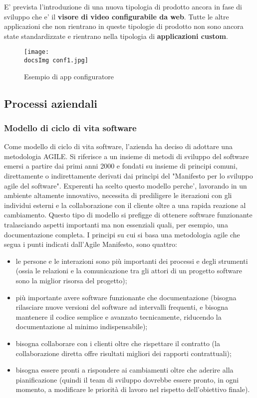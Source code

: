 E' prevista l'introduzione di una nuova tipologia di prodotto ancora in fase di sviluppo che e' il \textbf{visore di video configurabile da web}. Tutte le altre applicazioni che non rientrano in queste tipologie di prodotto non sono ancora state standardizzate e rientrano nella tipologia di \textbf{applicazioni custom}. 

\begin{figure}[H]
	\centering
	\texttt{[image: \\docsImg conf1.jpg]}
	\caption{Esempio di app configuratore}
	\label{fig:Esempio di app configuratore}
\end{figure}



\subsection{Processi aziendali}
\subsubsection{Modello di ciclo di vita software}
Come modello di ciclo di vita software, l'azienda ha deciso di adottare una metodologia AGILE. Si riferisce a un insieme di metodi di sviluppo del software emersi a partire dai primi anni 2000 e fondati su insieme di principi comuni, direttamente o indirettamente derivati dai princìpi del "Manifesto per lo sviluppo agile del software". Experenti ha scelto questo modello perche', lavorando in un ambiente altamente innovativo, necessita di prediligere le iterazioni con gli individui esterni e la collaborazione con il cliente oltre a una rapida reazione al cambiamento. Questo tipo di modello si prefigge di ottenere software funzionante tralasciando aspetti importanti ma non essenziali quali, per esempio, una documentazione completa.
I principi su cui si basa una metodologia agile che segua i punti indicati dall'Agile Manifesto, sono quattro:
\begin{itemize}
	\item le persone e le interazioni sono più importanti dei processi e degli strumenti (ossia le relazioni e la comunicazione tra gli attori di un progetto software sono la miglior risorsa del progetto);
	\item  più importante avere software funzionante che documentazione (bisogna rilasciare nuove versioni del software ad intervalli frequenti, e bisogna mantenere il codice semplice e avanzato tecnicamente, riducendo la documentazione al minimo indispensabile);
	\item bisogna collaborare con i clienti oltre che rispettare il contratto (la collaborazione diretta offre risultati migliori dei rapporti contrattuali);
	\item bisogna essere pronti a rispondere ai cambiamenti oltre che aderire alla pianificazione (quindi il team di sviluppo dovrebbe essere pronto, in ogni momento, a modificare le priorità di lavoro nel rispetto dell'obiettivo finale).
\end{itemize}

